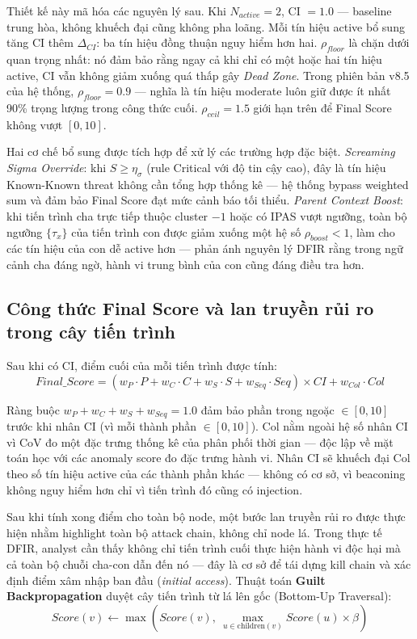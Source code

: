 \documentclass[../main.tex]{subfiles}
\begin{document}
Thiết kế này mã hóa các nguyên lý sau. Khi $N_{active} = 2$, CI $= 1.0$ — baseline trung hòa, không khuếch đại cũng không pha loãng. Mỗi tín hiệu active bổ sung tăng CI thêm $\Delta_{CI}$: ba tín hiệu đồng thuận nguy hiểm hơn hai. $\rho_{floor}$ là chặn dưới quan trọng nhất: nó đảm bảo rằng ngay cả khi chỉ có một hoặc hai tín hiệu active, CI vẫn không giảm xuống quá thấp gây \textit{Dead Zone}. Trong phiên bản v8.5 của hệ thống, $\rho_{floor} = 0.9$ — nghĩa là tín hiệu moderate luôn giữ được ít nhất 90\% trọng lượng trong công thức cuối. $\rho_{ceil} = 1.5$ giới hạn trên để Final Score không vượt $[0, 10]$.

Hai cơ chế bổ sung được tích hợp để xử lý các trường hợp đặc biệt. \textit{Screaming Sigma Override}: khi $S \ge \eta_\sigma$ (rule Critical với độ tin cậy cao), đây là tín hiệu Known-Known threat không cần tổng hợp thống kê — hệ thống bypass weighted sum và đảm bảo Final Score đạt mức cảnh báo tối thiểu. \textit{Parent Context Boost}: khi tiến trình cha trực tiếp thuộc cluster $-1$ hoặc có IPAS vượt ngưỡng, toàn bộ ngưỡng $\{\tau_x\}$ của tiến trình con được giảm xuống một hệ số $\rho_{boost} < 1$, làm cho các tín hiệu của con dễ active hơn — phản ánh nguyên lý DFIR rằng trong ngữ cảnh cha đáng ngờ, hành vi trung bình của con cũng đáng điều tra hơn.

\subsection{Công thức Final Score và lan truyền rủi ro trong cây tiến trình}
\label{subsection:2.5.2}

Sau khi có CI, điểm cuối của mỗi tiến trình được tính:
\begin{equation}
    Final\_Score = \left(w_P \cdot P + w_C \cdot C + w_S \cdot S + w_{Seq} \cdot Seq\right) \times CI + w_{Col} \cdot Col \tag{1.26}
\end{equation}

Ràng buộc $w_P + w_C + w_S + w_{Seq} = 1.0$ đảm bảo phần trong ngoặc $\in [0, 10]$ trước khi nhân CI (vì mỗi thành phần $\in [0, 10]$). Col nằm ngoài hệ số nhân CI vì CoV đo một đặc trưng thống kê của phân phối thời gian — độc lập về mặt toán học với các anomaly score đo đặc trưng hành vi. Nhân CI sẽ khuếch đại Col theo số tín hiệu active của các thành phần khác — không có cơ sở, vì beaconing không nguy hiểm hơn chỉ vì tiến trình đó cũng có injection.

Sau khi tính xong điểm cho toàn bộ node, một bước lan truyền rủi ro được thực hiện nhằm highlight toàn bộ attack chain, không chỉ node lá. Trong thực tế DFIR, analyst cần thấy không chỉ tiến trình cuối thực hiện hành vi độc hại mà cả toàn bộ chuỗi cha-con dẫn đến nó — đây là cơ sở để tái dựng kill chain và xác định điểm xâm nhập ban đầu (\textit{initial access}). Thuật toán \textbf{Guilt Backpropagation} duyệt cây tiến trình từ lá lên gốc (Bottom-Up Traversal):
\begin{equation}
    Score(v) \leftarrow \max\!\left(Score(v),\ \max_{u \in \text{children}(v)} Score(u) \times \beta\right) \tag{1.27}
\end{equation}
\end{document}
